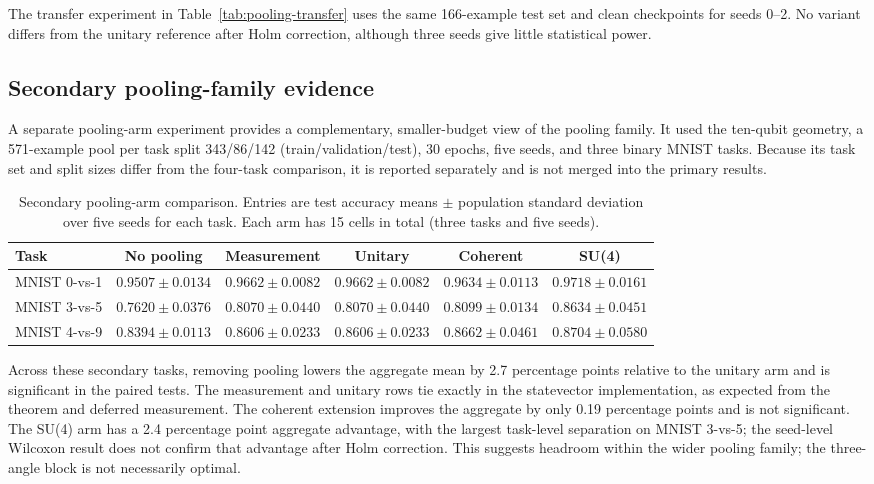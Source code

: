 \documentclass[conference]{IEEEtran}
\begin{document}
The transfer experiment in Table~\ref{tab:pooling-transfer} uses the same 166-example test set and clean checkpoints for seeds 0--2. No variant differs from the unitary reference after Holm correction, although three seeds give little statistical power.

\subsection{Secondary pooling-family evidence}
A separate pooling-arm experiment provides a complementary, smaller-budget
view of the pooling family. It used the ten-qubit geometry, a 571-example pool per task split 343/86/142 (train/validation/test), 30 epochs, five seeds, and three binary MNIST tasks. Because its task set and split sizes differ from
the four-task comparison, it is reported separately and is not merged into the
primary results.

\begin{table}[!t]
\caption{Secondary pooling-arm comparison. Entries are test accuracy means $\pm$ population standard deviation over five seeds for each task. Each arm has 15 cells in total (three tasks and five seeds).}
\label{tab:secondary-pooling}
\centering
\small
\begin{tabular}{@{}lccccc@{}}
\toprule
\textbf{Task} & \textbf{No pooling} & \textbf{Measurement} & \textbf{Unitary} & \textbf{Coherent} & \textbf{SU(4)} \\
\midrule
MNIST 0-vs-1 & $0.9507\pm0.0134$ & $0.9662\pm0.0082$ & $0.9662\pm0.0082$ & $0.9634\pm0.0113$ & $0.9718\pm0.0161$ \\
MNIST 3-vs-5 & $0.7620\pm0.0376$ & $0.8070\pm0.0440$ & $0.8070\pm0.0440$ & $0.8099\pm0.0134$ & $0.8634\pm0.0451$ \\
MNIST 4-vs-9 & $0.8394\pm0.0113$ & $0.8606\pm0.0233$ & $0.8606\pm0.0233$ & $0.8662\pm0.0461$ & $0.8704\pm0.0580$ \\
\bottomrule
\end{tabular}
\end{table}

Across these secondary tasks, removing pooling lowers the aggregate mean by
2.7 percentage points relative to the unitary arm and is significant in the
paired tests. The measurement and unitary rows tie exactly in the
statevector implementation, as expected from the theorem and deferred
measurement. The coherent extension improves the aggregate by only 0.19
percentage points and is not significant. The SU(4) arm has a 2.4 percentage
point aggregate advantage, with the largest task-level separation on
MNIST 3-vs-5; the seed-level Wilcoxon result does not confirm that advantage
after Holm correction. This suggests headroom within the wider pooling family; the three-angle block is not necessarily optimal.
\end{document}
